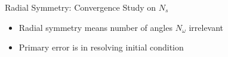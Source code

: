 \documentclass{beamer}
\begin{document}
\begin{frame}{Radial Symmetry: Convergence Study on $N_s$}
    \centering
    \begin{itemize}
        \item Radial symmetry means number of angles $N_\omega$ irrelevant
        \item Primary error is in resolving initial condition
    \end{itemize}  
    \centering
\end{frame}
\end{document}
